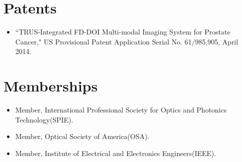 \documentclass{my_cv}
\begin{document}

\section{{Patents}} 

\vspace{-2mm} %
\begin{itemize} \itemsep -2pt %
\item ``TRUS-Integrated FD-DOI Multi-modal Imaging System for Prostate Cancer," US Provisional Patent Application Serial No. 61/985,905, April 2014. 
\end{itemize}



\vspace{-5mm} %


\section{{Memberships}} 

\vspace{-2mm} %

\begin{itemize} \itemsep -2pt 
\item Member, International Professional Society for Optics and Photonics Technology(SPIE).
\item Member, Optical Society of America(OSA). 
\item Member, Institute of Electrical and Electronics Engineers(IEEE). 
\end{itemize}


\vspace{-5mm} %

\end{document}

